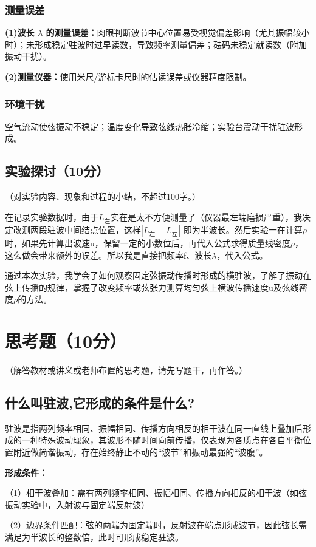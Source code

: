 \documentclass[]{../../templates/Report}%
\begin{document}
\begin{fullreportonly}
\subsubsection{测量误差}
\textbf{(1)波长 $\lambda$ 的测量误差：}肉眼判断波节中心位置易受视觉偏差影响（尤其振幅较小时）；未形成稳定驻波时过早读数，导致频率测量偏差；砝码未稳定就读数（附加振动干扰）。
\par
\textbf{(2)测量仪器：}使用米尺/游标卡尺时的估读误差或仪器精度限制。

\subsubsection{环境干扰}
空气流动使弦振动不稳定；温度变化导致弦线热胀冷缩；实验台震动干扰驻波形成。

\subsection{实验探讨（10分）}
（对实验内容、现象和过程的小结，不超过100字。）
\par
在记录实验数据时，由于$L_\text{左}$实在是太不方便测量了（仪器最左端磨损严重），我决定改测两段驻波中间结点位置，这样$|L_\text{左} - L_\text{左}|$ 即为半波长。然后实验一在计算$\rho$时，如果先计算出波速u，保留一定的小数位后，再代入公式求得质量线密度$\rho$，这么做会带来额外的误差。所以我是直接把频率f、波长$\lambda$，代入公式。
\par
通过本次实验，我学会了如何观察固定弦振动传播时形成的横驻波，了解了振动在弦上传播的规律，掌握了改变频率或弦张力测算均匀弦上横波传播速度u及弦线密度$\rho$的方法。

\section{思考题（10分）}
（解答教材或讲义或老师布置的思考题，请先写题干，再作答。）
\subsection{什么叫驻波,它形成的条件是什么?}
驻波是指两列频率相同、振幅相同、传播方向相反的相干波在同一直线上叠加后形成的一种特殊波动现象，其波形不随时间向前传播，仅表现为各质点在各自平衡位置附近做简谐振动，存在始终静止不动的“波节”和振动最强的“波腹”。
\par
\textbf{形成条件：}
\par
（1）相干波叠加：需有两列频率相同、振幅相同、传播方向相反的相干波（如弦振动实验中，入射波与固定端反射波）
\par
（2）边界条件匹配：弦的两端为固定端时，反射波在端点形成波节，因此弦长需满足为半波长的整数倍，此时可形成稳定驻波。


\end{fullreportonly}
\end{document}
